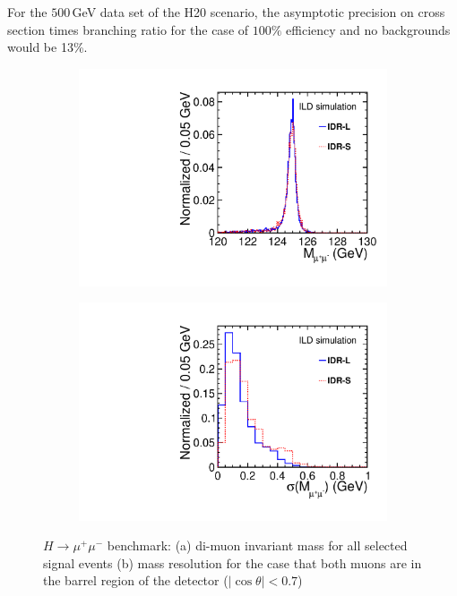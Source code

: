 For the $500$\,GeV data set of the H20 scenario, the asymptotic precision on cross section times branching ratio for the case of $100\%$ efficiency and no backgrounds would be 13\%.  
\begin{figure}[htbp]
\begin{subfigure}{0.49\hsize}  
\includegraphics[width=\textwidth]{Performance/fig/mumu_mass.pdf}
\caption{ \label{fig:Hmumu:mass}}
 \end{subfigure}
\begin{subfigure}{0.49\hsize}  \includegraphics[width=\textwidth]{Performance/fig/sigma_mumu_mass_07.pdf}
 \caption{  \label{fig:Hmumu:sigma}}
 \end{subfigure}
\caption{$H \to \mu^+\mu^-$ benchmark:
(a) di-muon invariant mass for all selected signal events
(b) mass resolution for the case that both muons are in the barrel region of the detector ($|\cos{\theta}| < 0.7$)
}
\label{fig:Hmumu}
\end{figure}

